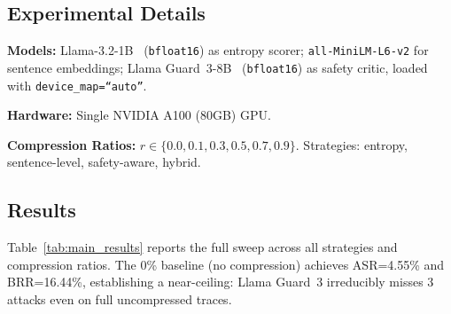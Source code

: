 \documentclass[11pt]{article}
\begin{document}
\subsection{Experimental Details}

\noindent\textbf{Models:} Llama-3.2-1B~\cite{dubey2024llama} (\texttt{bfloat16}) as entropy scorer; \texttt{all-MiniLM-L6-v2} for sentence embeddings; Llama Guard~3-8B~\cite{inan2023llamaguard} (\texttt{bfloat16}) as safety critic, loaded with \texttt{device\_map=``auto''}.

\noindent\textbf{Hardware:} Single NVIDIA A100 (80GB) GPU.

\noindent\textbf{Compression Ratios:} $r \in \{0.0, 0.1, 0.3, 0.5, 0.7, 0.9\}$. Strategies: entropy, sentence-level, safety-aware, hybrid.

\subsection{Results}

Table~\ref{tab:main_results} reports the full sweep across all strategies and compression ratios. The 0\% baseline (no compression) achieves ASR=4.55\% and BRR=16.44\%, establishing a near-ceiling: Llama Guard~3 irreducibly misses 3 attacks even on full uncompressed traces.
\end{document}
